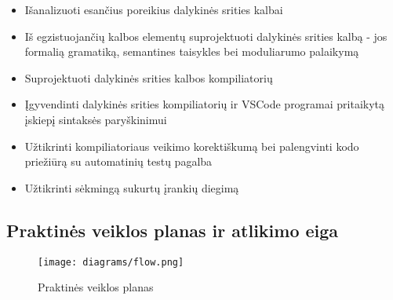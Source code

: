 \begin{itemize}
    \item Išanalizuoti esančius poreikius dalykinės srities kalbai

    \item Iš egzistuojančių kalbos elementų suprojektuoti dalykinės srities kalbą - jos formalią gramatiką, semantines taisykles bei moduliarumo palaikymą
    
    \item Suprojektuoti dalykinės srities kalbos kompiliatorių

    \item Įgyvendinti dalykinės srities kompiliatorių ir VSCode programai pritaikytą įskiepį sintaksės paryškinimui

    \item Užtikrinti kompiliatoriaus veikimo korektiškumą bei palengvinti kodo priežiūrą su automatinių
    testų pagalba

    \item Užtikrinti sėkmingą sukurtų įrankių diegimą

\end{itemize}

\newpage

\subsection*{Praktinės veiklos planas ir atlikimo eiga}

\begin{figure}[!htb]
    \centering
    \texttt{[image: diagrams/flow.png]}
    \caption{Praktinės veiklos planas}
    \label{fig:plan}
\end{figure}